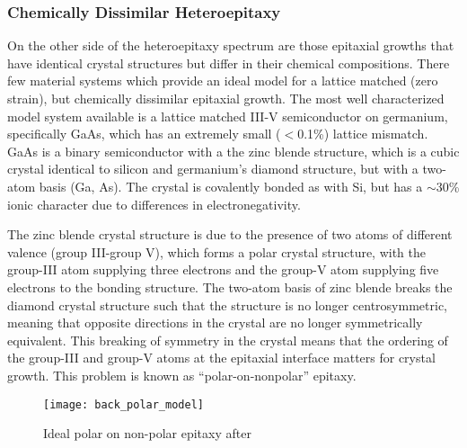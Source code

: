 \subsubsection{Chemically Dissimilar Heteroepitaxy}
On the other side of the heteroepitaxy spectrum are those epitaxial growths that have identical crystal structures but differ in their chemical compositions. There few material systems which provide an ideal model for a lattice matched (zero strain), but chemically dissimilar epitaxial growth. The most well characterized model system available is a lattice matched III-V semiconductor on germanium, specifically GaAs, which has an extremely small ($<$0.1\%) lattice mismatch. GaAs is a binary semiconductor with a the zinc blende structure, which is a cubic crystal identical to silicon and germanium's diamond structure, but with a two-atom basis (Ga, As). The crystal is covalently bonded as with Si, but has a $\sim$30\% ionic character due to differences in electronegativity\cite{Christensen1987}.

The zinc blende crystal structure is due to the presence of two atoms of different valence (group III-group V), which forms a polar crystal structure, with the group-III atom supplying three electrons and the group-V atom supplying five electrons to the bonding structure. The two-atom basis of zinc blende breaks the diamond crystal structure such that the structure is no longer centrosymmetric, meaning that opposite directions in the crystal are no longer symmetrically equivalent. This breaking of symmetry in the crystal means that the ordering of the group-III and group-V atoms at the epitaxial interface matters for crystal growth. This problem is known as ``polar-on-nonpolar'' epitaxy\cite{Biegelsen1992,Kroemer1987}.
\begin{figure}
    \centering
    \texttt{[image: back\_polar\_model]}
    \caption[Atomic model of polar on non-polar]{\label{fig:back_polar_model}Ideal polar on non-polar epitaxy after \cite{Biegelsen1992}}
\end{figure}

